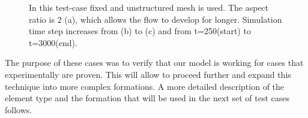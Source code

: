 \documentclass[preprint,authoryear,12pt]{elsarticle}
\begin{document}
\begin{figure}[h]
\begin{center}
\caption{In this test-case fixed and unstructured mesh is used. The aspect ratio is 2 (a), which allows the flow to develop for longer. Simulation time step increases from (b) to (c) and from t=250(start) to t=3000(end).}
\label{fig:testcase}
\end{center}
\end{figure}

 The purpose of these cases was to verify that our model is working for cases that experimentally are proven. This will allow to proceed further and expand this technique into more complex formations. A more detailed description of the element type and the formation that will be used in the next set of test cases follows.
\end{document}
